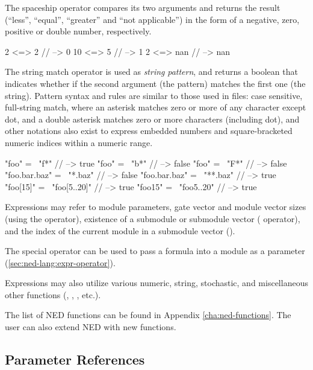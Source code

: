 The spaceship operator \ttt{<=>} compares its two arguments and returns the
result (``less'', ``equal'', ``greater'' and ``not applicable'') in the form of
a negative, zero, positive or  double number, respectively.

\begin{ned}
    2 <=> 2  // --> 0
    10 <=> 5  // --> 1
    2 <=> nan // --> nan
\end{ned}

The string match operator \ttt{=\~} is used as \textit{string} \ttt{=\~} \textit{pattern},
and returns a boolean that indicates whether if the
second argument (the pattern) matches the first one (the string). Pattern syntax
and rules are similar to those used in  files: case
sensitive, full-string match, where an asterisk \ttt{*} matches zero or more of
any character except dot, and a double asterisk \ttt{**} matches zero or more
characters (including dot), and other notations also exist to express embedded
numbers and square-bracketed numeric indices within a numeric range.

\begin{ned}
    "foo" =~ "f*" // --> true
    "foo" =~ "b*" // --> false
    "foo" =~ "F*" // --> false
    "foo.bar.baz" =~ "*.baz" // --> false
    "foo.bar.baz" =~ "**.baz" // --> true
    "foo[15]" =~ "foo[5..20]" // --> true
    "foo15" =~ "foo{5..20}" // --> true
\end{ned}

Expressions may refer to module parameters, gate vector and module vector sizes
(using the  operator), existence of a submodule or submodule
vector ( operator), and the index of the current module in a
submodule vector ().

The special operator  can be used to pass a formula into a
module as a parameter (\ref{sec:ned-lang:expr-operator}).

Expressions may also utilize various numeric, string, stochastic, and
miscellaneous other functions (, , ,
etc.).

\begin{note}
    The list of NED functions can be found in Appendix \ref{cha:ned-functions}.
    The user can also extend NED with new functions.
\end{note}


\subsection{Parameter References}
\label{sec:ned-lang:parameter-references}


